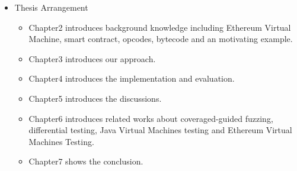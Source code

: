 \documentclass[a4paper]{article}
\begin{document}
\begin{itemize}
\begin{itemize}
		\end{itemize}
		\item Thesis Arrangement
		\begin{itemize}
			\item Chapter2 introduces background knowledge  including Ethereum Virtual Machine, smart contract, opcodes, bytecode and an motivating example. 
			\item Chapter3 introduces our approach.
			\item Chapter4 introduces the implementation and evaluation.
			\item Chapter5 introduces the discussions.
			\item Chapter6 introduces related works about coveraged-guided fuzzing, differential testing, Java Virtual Machines testing and Ethereum Virtual Machines Testing.
			\item Chapter7 shows the conclusion.
		\end{itemize}
	\end{itemize}
	
\end{document}
